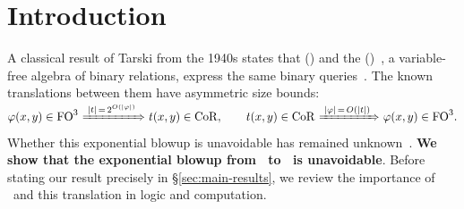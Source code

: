 \section{Introduction}

A classical result of Tarski from the 1940s states that  (\FOthree) and the  (\CoR)~\citep{tarski1941}, a variable-free algebra of binary relations, express the same binary queries~\citep{tarski-givant1987,givant2006}.
The known translations between them have asymmetric size bounds:
\[
\varphi(x,y)\in\mathrm{FO}^3
\ \smash{\xRightarrow{\;|t|\,=\,2^{O(|\varphi|)}\;}}\ 
t(x, y) \in\CoR,
\qquad
t(x, y) \in\mathrm{CoR}
\ \smash{\xRightarrow{\;|\varphi|\,=\,O(|t|)\;}}\ 
\varphi(x,y)\in\FOthree.
\]
Whether this exponential blowup is unavoidable has remained unknown~\citep{FletcherEtAl2015,nakamura2022,nakamura-uezato2027}.
\textbf{We show that the exponential blowup from \FOthree\ to \CoR\ is unavoidable}.
Before stating our result precisely in \S\ref{sec:main-results},
we review the importance of \FOthree\ and this translation in logic and computation.

